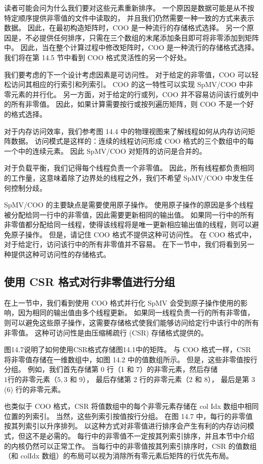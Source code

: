 读者可能会问为什么我们要对这些元素重新排序。 一个原因是数据可能是从不按特定顺序提供非零值的文件中读取的，
并且我们仍然需要一种一致的方式来表示数据。 因此，在最初构造矩阵时，$\mathrm{COO}$ 是一种流行的存储格式选择。 
另一个原因是，不必提供任何排序，只需在三个数组的末尾添加条目即可将非零添加到矩阵中。 
因此，当在整个计算过程中修改矩阵时，$\mathrm{COO}$ 是一种流行的存储格式选择。 
我们将在第 14.5 节中看到 COO 格式灵活性的另一个好处。

我们要考虑的下一个设计考虑因素是可访问性。 对于给定的非零值，COO 可以轻松访问其相应的行索引和列索引。 
$\mathrm{COO}$ 的这一特性可以实现 SpMV/COO 中非零元素的并行化。 
另一方面，对于给定的行或列，COO 并不容易访问该行或列中的所有非零值。 
因此，如果计算需要按行或按列遍历矩阵，则 $\mathrm{COO}$ 不是一个好的格式选择。

对于内存访问效率，我们参考图 14.4 中的物理视图来了解线程如何从内存访问矩阵数据。 
访问模式是这样的：连续的线程访问形成 COO 格式的三个数组中的每一个中的连续元素。 因此 SpMV/COO 对矩阵的访问是合并的。

对于负载平衡，我们记得每个线程负责一个非零值。 
因此，所有线程都负责相同的工作量，这意味着除了边界处的线程之外，我们不希望 SpMV/COO 中发生任何控制分歧。

SpMV/COO 的主要缺点是需要使用原子操作。 使用原子操作的原因是多个线程被分配给同一行中的非零值，因此需要更新相同的输出值。 
如果同一行中的所有非零值都分配给同一线程，使得该线程将是唯一更新相应输出值的线程，则可以避免原子操作。 
但是，请记住 $\mathrm{COO}$ 格式不提供这种可访问性。 
在 $\mathrm{COO}$ 格式中，对于给定行，访问该行中的所有非零值并不容易。 
在下一节中，我们将看到另一种提供这种可访问性的存储格式。

\subsection{使用 CSR 格式对行非零值进行分组}
在上一节中，我们看到使用 COO 格式并行化 SpMV 会受到原子操作使用的影响，因为相同的输出值由多个线程更新。 
如果同一线程负责一行的所有非零值，则可以避免这些原子操作，这需要存储格式使我们能够访问给定行中该行中的所有非零值。 
这种可访问性是由压缩稀疏行 (CSR) 存储格式提供的。

图14.7说明了如何使用CSR格式存储图14.1中的矩阵。 
与 COO 格式一样，CSR 将非零值存储在一维数组中，如图 14.2 中的值数组所示。 但是，这些非零值按行分组。 
例如，我们首先存储第 0 行（1 和 7）的非零元素，然后存储 $1 行的非零元素（5,3$ 和 9），
最后存储第 2 行的非零元素（2 和 8）， 最后是第 3 (6) 行的非零元素。

也类似于 $\mathrm{COO}$ 格式，CSR 将值数组中的每个非零元素存储在 col Idx 数组中相同位置的列索引。 
当然，这些列索引按值按行分组。 在图 14.7 中，每行的非零值按其列索引以升序排列。 
以这种方式对非零值进行排序会产生有利的内存访问模式，但这不是必需的。 
每行中的非零值不一定按其列索引排序，并且本节中介绍的内核仍然可以正常工作。 
当每行中的非零值按其列索引排序时，CSR 的值数组（和 colIdx 数组）的布局可以视为消除所有零元素后矩阵的行优先布局。

